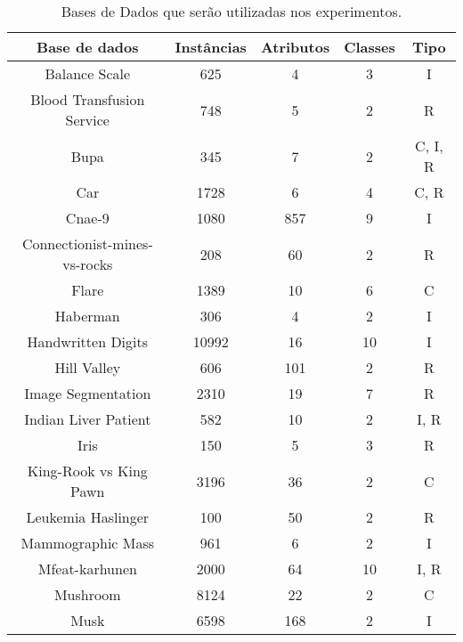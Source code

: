     \begin{table}[h]
        \caption{Bases de Dados que serão utilizadas nos experimentos.}
        \centering
        \begin{tabular}{|c|c|c|c|c|} \hline
            \textbf{Base de dados} & \textbf{Instâncias} & \textbf{Atributos} & \textbf{Classes} & \textbf{Tipo} \\ \hline
            Balance Scale                   &  625  &   4 &  3 & I \\ \hline
            Blood Transfusion Service       &  748  &   5 &  2 & R \\ \hline
            Bupa                            &  345  &   7 &  2 & C, I, R \\ \hline
            Car                             & 1728  &   6 &  4 & C, R \\ \hline
            Cnae-9                          & 1080  & 857 &  9 & I \\ \hline
            Connectionist-mines-vs-rocks    &  208  &  60 &  2 & R \\ \hline
            Flare                           & 1389  &  10 &  6 & C \\ \hline
            Haberman                        &  306  &   4 &  2 & I \\ \hline
            Handwritten Digits              & 10992 &  16 & 10 & I \\ \hline
            Hill Valley                     &  606  & 101 &  2 & R \\ \hline
            Image Segmentation              & 2310  &  19 &  7 & R \\ \hline
            Indian Liver Patient            &  582  &  10 &  2 & I, R \\ \hline
            Iris                            &  150  &   5 &  3 & R \\ \hline
            King-Rook vs King Pawn          & 3196  &  36 &  2 & C \\ \hline
            Leukemia Haslinger              &  100  &  50 &  2 & R \\ \hline
            Mammographic Mass               &  961  &   6 &  2 & I \\ \hline
            Mfeat-karhunen                  & 2000  &  64 & 10 & I, R \\ \hline
            Mushroom                        & 8124  &  22 &  2 & C \\ \hline
            Musk                            & 6598  & 168 &  2 & I \\ \hline

\end{tabular}
\end{table}
